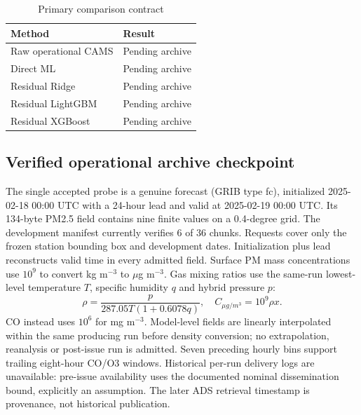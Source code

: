 \documentclass[journal]{IEEEtran}
\begin{document}
\begin{table}[h]\centering\caption{Primary comparison contract}
\begin{tabular}{ll}\toprule Method & Result \\\midrule
Raw operational CAMS & Pending archive \\
Direct ML & Pending archive \\
Residual Ridge & Pending archive \\
Residual LightGBM & Pending archive \\
Residual XGBoost & Pending archive \\\bottomrule\end{tabular}\end{table}






\subsection{Verified operational archive checkpoint}
The single accepted probe is a genuine forecast (GRIB type fc), initialized
2025-02-18 00:00 UTC with a 24-hour lead and valid at 2025-02-19 00:00 UTC.
Its 134-byte PM2.5 field contains nine finite values on a 0.4-degree grid.
The development manifest currently verifies 6 of 36 chunks.
Requests cover only the frozen station bounding box and development dates.
Initialization plus lead reconstructs valid time in every admitted field.
Surface PM mass concentrations use $10^9$ to convert kg m$^{-3}$ to
$\mu$g m$^{-3}$. Gas mixing ratios use the same-run lowest-level
temperature $T$, specific humidity $q$ and hybrid pressure $p$:
\begin{equation}
\rho=\frac{p}{287.05T(1+0.6078q)},\quad C_{\mu g/m^3}=10^9\rho x.
\end{equation}
CO instead uses $10^6$ for mg m$^{-3}$. Model-level fields are linearly
interpolated within the same producing run before density conversion;
no extrapolation, reanalysis or post-issue run is admitted. Seven preceding
hourly bins support trailing eight-hour CO/O3 windows.
Historical per-run delivery logs are unavailable: pre-issue availability
uses the documented nominal dissemination bound, explicitly an assumption.
The later ADS retrieval timestamp is provenance, not historical publication.
\end{document}
